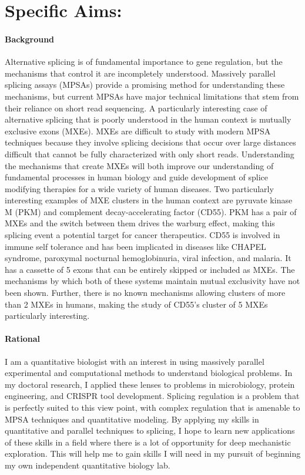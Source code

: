 \documentclass[11pt]{article}
\begin{document}
\section*{Specific Aims:}
\paragraph{Background}
Alternative splicing is of fundamental importance to gene regulation, but the mechanisms that control it are incompletely understood.
Massively parallel splicing assays (MPSAs) provide a promising method for understanding these mechanisms, but current MPSAs have  major technical limitations that stem from their reliance on short read sequencing.
A particularly interesting case of alternative splicing that is poorly understood in the human context is mutually exclusive exons (MXEs).
MXEs are difficult to study with modern MPSA techniques because they involve splicing decisions that occur over large distances difficult that cannot be fully characterized with only short reads.
Understanding the mechanisms that create MXEs will both improve our understanding of fundamental processes in human biology and guide development of splice modifying therapies for a wide variety of human diseases.
Two particularly interesting examples of MXE clusters in the human context are pyruvate kinase M (PKM) and complement decay-accelerating factor (CD55).
PKM has a pair of MXEs and the switch between them drives the warburg effect, making this splicing event a potential target for cancer therapeutics.
CD55 is involved in immune self tolerance and has been implicated in diseases like CHAPEL syndrome, paroxymal nocturnal hemoglobinuria, viral infection, and malaria. 
It has a cassette of 5 exons that can be entirely skipped or included as MXEs.
The mechanisms by which both of these systems maintain mutual exclusivity have not been shown.
Further, there is no known mechanisms allowing clusters of more than 2 MXEs in humans, making the study of CD55's cluster of 5 MXEs particularly interesting.
%
\paragraph{Rational}
I am a quantitative biologist with an interest in using massively parallel experimental and computational methods to understand biological problems.
In my doctoral research, I applied these lenses to problems in microbiology, protein engineering, and CRISPR tool development.
Splicing regulation is a problem that is perfectly suited to this view point, with complex regulation that is amenable to MPSA techniques and quantitative modeling.
By applying my skills in quantitative and parallel techniques to splicing, I hope to learn new applications of these skills in a field where there is a lot of opportunity for deep mechanistic exploration.
This will help me to gain skills I will need in my pursuit of beginning my own independent quantitative biology lab.
%
\end{document}
